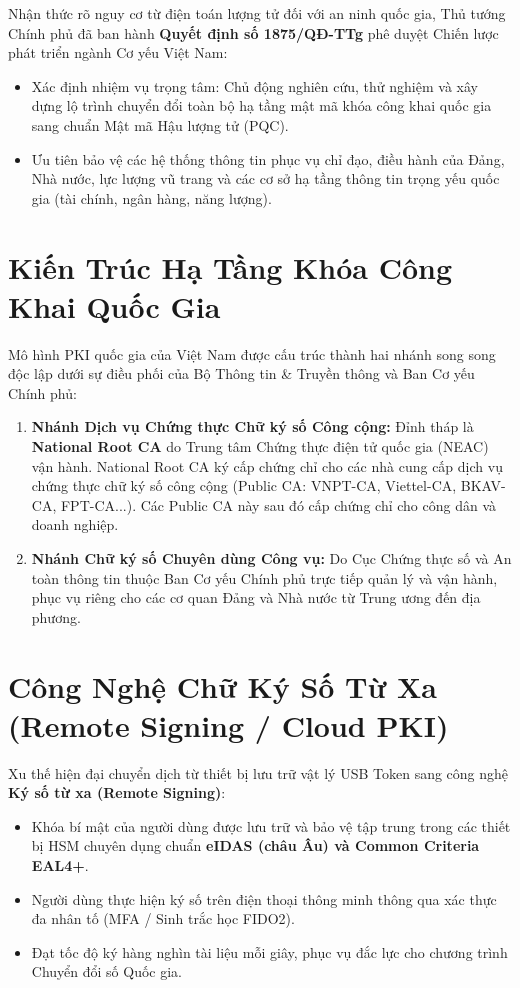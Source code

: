 Nhận thức rõ nguy cơ từ điện toán lượng tử đối với an ninh quốc gia, Thủ tướng Chính phủ đã ban hành \textbf{Quyết định số 1875/QĐ-TTg} phê duyệt Chiến lược phát triển ngành Cơ yếu Việt Nam:
\begin{itemize}
  \item Xác định nhiệm vụ trọng tâm: Chủ động nghiên cứu, thử nghiệm và xây dựng lộ trình chuyển đổi toàn bộ hạ tầng mật mã khóa công khai quốc gia sang chuẩn Mật mã Hậu lượng tử (PQC).
  \item Ưu tiên bảo vệ các hệ thống thông tin phục vụ chỉ đạo, điều hành của Đảng, Nhà nước, lực lượng vũ trang và các cơ sở hạ tầng thông tin trọng yếu quốc gia (tài chính, ngân hàng, năng lượng).
\end{itemize}

\section{Kiến Trúc Hạ Tầng Khóa Công Khai Quốc Gia}

Mô hình PKI quốc gia của Việt Nam được cấu trúc thành hai nhánh song song độc lập dưới sự điều phối của Bộ Thông tin \& Truyền thông và Ban Cơ yếu Chính phủ:
\begin{enumerate}
  \item \textbf{Nhánh Dịch vụ Chứng thực Chữ ký số Công cộng:}
  Đỉnh tháp là \textbf{National Root CA} do Trung tâm Chứng thực điện tử quốc gia (NEAC) vận hành. National Root CA ký cấp chứng chỉ cho các nhà cung cấp dịch vụ chứng thực chữ ký số công cộng (Public CA: VNPT-CA, Viettel-CA, BKAV-CA, FPT-CA...). Các Public CA này sau đó cấp chứng chỉ cho công dân và doanh nghiệp.
  \item \textbf{Nhánh Chữ ký số Chuyên dùng Công vụ:}
  Do Cục Chứng thực số và An toàn thông tin thuộc Ban Cơ yếu Chính phủ trực tiếp quản lý và vận hành, phục vụ riêng cho các cơ quan Đảng và Nhà nước từ Trung ương đến địa phương.
\end{enumerate}

\section{Công Nghệ Chữ Ký Số Từ Xa (Remote Signing / Cloud PKI)}

Xu thế hiện đại chuyển dịch từ thiết bị lưu trữ vật lý USB Token sang công nghệ \textbf{Ký số từ xa (Remote Signing)}:
\begin{itemize}
  \item Khóa bí mật của người dùng được lưu trữ và bảo vệ tập trung trong các thiết bị HSM chuyên dụng chuẩn \textbf{eIDAS (châu Âu) và Common Criteria EAL4+}.
  \item Người dùng thực hiện ký số trên điện thoại thông minh thông qua xác thực đa nhân tố (MFA / Sinh trắc học FIDO2).
  \item Đạt tốc độ ký hàng nghìn tài liệu mỗi giây, phục vụ đắc lực cho chương trình Chuyển đổi số Quốc gia.
\end{itemize}

